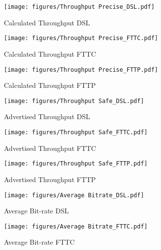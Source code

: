 \documentclass[10pt,sigconf]{acmart}
\begin{document}

\begin{figure}
    \centering
    \texttt{[image: figures/Throughput Precise\_DSL.pdf]}
    \caption{Calculated Throughput DSL}
    \label{fig:throughput-precise-DSL}
\end{figure}

\begin{figure}
    \centering
    \texttt{[image: figures/Throughput Precise\_FTTC.pdf]}
    \caption{Calculated Throughput FTTC}
    \label{fig:throughput-precise-FTTC}
\end{figure}

\begin{figure}
    \centering
    \texttt{[image: figures/Throughput Precise\_FTTP.pdf]}
    \caption{Calculated Throughput FTTP}
    \label{fig:throughput-precise-FTTP}
\end{figure}

\begin{figure}
    \centering
    \texttt{[image: figures/Throughput Safe\_DSL.pdf]}
    \caption{Advertised Throughput DSL}
    \label{fig:throughput-safe-DSL}
\end{figure}

\begin{figure}
    \centering
    \texttt{[image: figures/Throughput Safe\_FTTC.pdf]}
    \caption{Advertised Throughput FTTC}
    \label{fig:throughput-safe-FTTC}
\end{figure}

\begin{figure}
    \centering
    \texttt{[image: figures/Throughput Safe\_FTTP.pdf]}
    \caption{Advertised Throughput FTTP}
    \label{fig:throughput-safe-FTTP}
\end{figure}

\begin{figure}
    \centering
    \texttt{[image: figures/Average Bitrate\_DSL.pdf]}
    \caption{Average Bit-rate DSL}
    \label{fig:avg-bitrate-DSL}
\end{figure}

\begin{figure}
    \centering
    \texttt{[image: figures/Average Bitrate\_FTTC.pdf]}
    \caption{Average Bit-rate FTTC}
    \label{fig:avg-bitrate-FTTC}
\end{figure}
\end{document}
